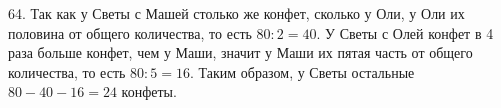 64. Так как у Светы с Машей столько же конфет, сколько у Оли, у Оли их половина от общего количества, то есть $80:2=40.$ У Светы с Олей конфет в 4 раза больше конфет, чем у Маши, значит у Маши их пятая часть от общего количества, то есть $80:5=16.$ Таким образом, у Светы остальные $80-40-16=24$ конфеты.\\
